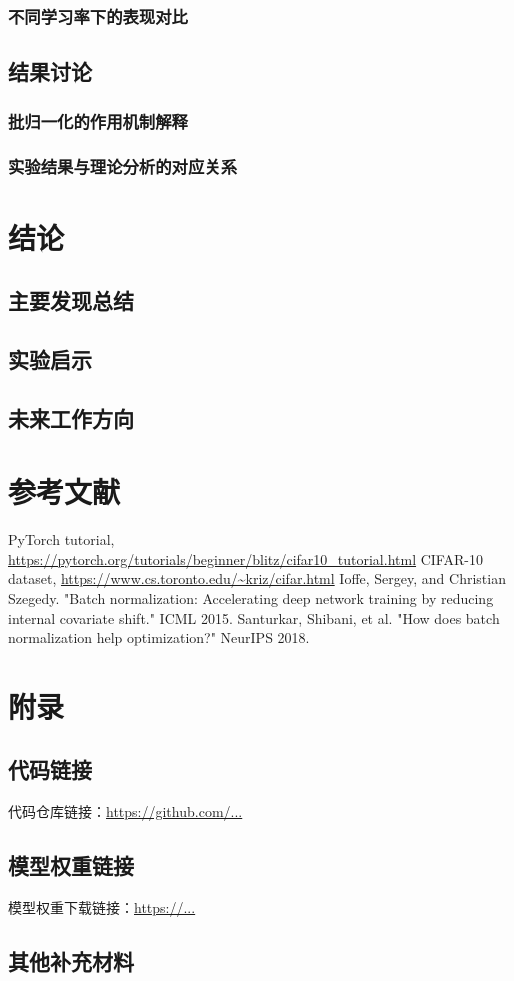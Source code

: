 \documentclass[12pt,a4paper]{article}
\begin{document}
\subsubsection{不同学习率下的表现对比}

\subsection{结果讨论}
\subsubsection{批归一化的作用机制解释}

\subsubsection{实验结果与理论分析的对应关系}

\section{结论}
\subsection{主要发现总结}

\subsection{实验启示}

\subsection{未来工作方向}

\section{参考文献}
\begin{thebibliography}{9}
 PyTorch tutorial, \url{https://pytorch.org/tutorials/beginner/blitz/cifar10_tutorial.html}
 CIFAR-10 dataset, \url{https://www.cs.toronto.edu/~kriz/cifar.html}
 Ioffe, Sergey, and Christian Szegedy. "Batch normalization: Accelerating deep network training by reducing internal covariate shift." ICML 2015.
 Santurkar, Shibani, et al. "How does batch normalization help optimization?" NeurIPS 2018.
\end{thebibliography}

\section{附录}
\subsection{代码链接}
代码仓库链接：\url{https://github.com/...}

\subsection{模型权重链接}
模型权重下载链接：\url{https://...}

\subsection{其他补充材料}
\end{document}
